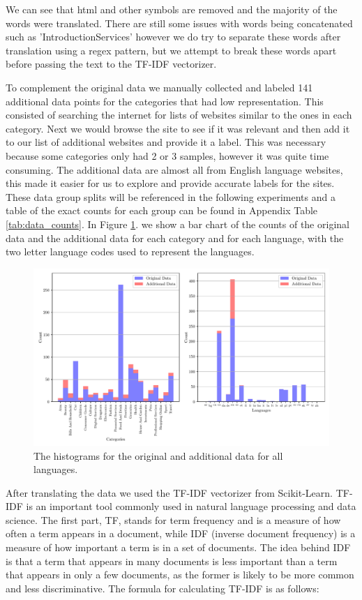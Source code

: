 We can see that html and other symbols are removed and the majority of the words were translated. There are still some issues with words being concatenated such as 'IntroductionServices' however we do try to separate these words after translation using a regex pattern, but we attempt to break these words apart before passing the text to the TF-IDF vectorizer.

To complement the original data we manually collected and labeled 141 additional data points for the categories that had low representation. This consisted of searching the internet for lists of websites similar to the ones in each category. Next we would browse the site to see if it was relevant and then add it to our list of additional websites and provide it a label. This was necessary because some categories only had 2 or 3 samples, however it was quite time consuming. The additional data are almost all from English language websites, this made it easier for us to explore and provide accurate labels for the sites. These data group splits will be referenced in the following experiments and a table of the exact counts for each group can be found in Appendix Table \ref{tab:data_counts}. In Figure \ref{fig:all_hist}. we show a bar chart of the counts of the original data and the additional data for each category and for each language, with the two letter language codes used to represent the languages.

\begin{figure}[!ht]
  \centering
  \includegraphics[width=\textwidth]{../img/plot_all_hist.pdf}
  \caption{The histograms for the original and additional data for all languages.}
  \label{fig:all_hist}
\end{figure}


After translating the data we used the TF-IDF vectorizer from Scikit-Learn. TF-IDF is an important tool commonly used in natural language processing and data science. The first part, TF, stands for term frequency and is a measure of how often a term appears in a document, while IDF (inverse document frequency) is a measure of how important a term is in a set of documents. The idea behind IDF is that a term that appears in many documents is less important than a term that appears in only a few documents, as the former is likely to be more common and less discriminative. The formula for calculating TF-IDF is as follows:

